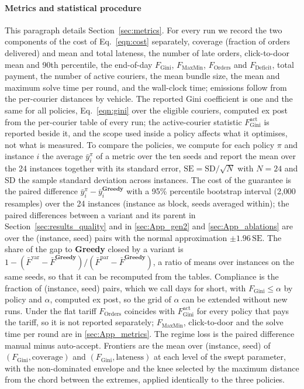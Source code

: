 \documentclass[a4paper,11pt,review,3p,authoryear]{elsarticle}
\newcommand{\FG}{F_{\text{Gini}}}
\newcommand{\FGa}{F_{\text{Gini}}^{\text{act}}}
\newcommand{\FD}{F_{\text{Deficit}}}
\newcommand{\FO}{F_{\text{Orders}}}
\newcommand{\FM}{F_{\text{MaxMin}}}
\begin{document}
\paragraph{Metrics and statistical procedure} This paragraph details Section~\ref{sec:metrics}. For every run we record the two components of the cost of Eq.~\eqref{eqn:cost} separately, coverage (fraction of orders delivered) and mean and total lateness, the number of late orders, click-to-door mean and 90th percentile, the end-of-day $\FG$, $\FM$, $\FO$ and $\FD$, total payment, the number of active couriers, the mean bundle size, the mean and maximum solve time per round, and the wall-clock time; emissions follow from the per-courier distances by vehicle. The reported Gini coefficient is one and the same for all policies, Eq.~\eqref{eqn:gini} over the eligible couriers, computed ex post from the per-courier table of every run; the active-courier statistic $\FGa$ is reported beside it, and the scope used inside a policy affects what it optimises, not what is measured. To compare the policies, we compute for each policy $\pi$ and instance $i$ the average $\bar y_i^{\pi}$ of a metric over the ten seeds and report the mean over the 24 instances together with its standard error, $\mathrm{SE} = \mathrm{SD}/\sqrt{N}$ with $N = 24$ and SD the sample standard deviation across instances. The cost of the guarantee is the paired difference $\bar y_i^{\pi} - \bar y_i^{\textbf{Greedy}}$ with a 95\% percentile bootstrap interval (2{,}000 resamples) over the 24 instances (instance as block, seeds averaged within); the paired differences between a variant and its parent in Section~\ref{sec:results_quality} and in \ref{sec:App_gen2} and \ref{sec:App_ablations} are over the (instance, seed) pairs with the normal approximation $\pm 1.96\,\mathrm{SE}$. The share of the gap to \textbf{Greedy} closed by a variant is $1 - (\bar F^{\text{var}} - \bar F^{\textbf{Greedy}})/(\bar F^{\text{par}} - \bar F^{\textbf{Greedy}})$, a ratio of means over instances on the same seeds, so that it can be recomputed from the tables. Compliance is the fraction of (instance, seed) pairs, which we call days for short, with $\FG \le \alpha$ by policy and $\alpha$, computed ex post, so the grid of $\alpha$ can be extended without new runs. Under the flat tariff $\FO$ coincides with $\FGa$ for every policy that pays the tariff, so it is not reported separately; $\FM$, click-to-door and the solve time per round are in \ref{sec:App_metrics}. The regime loss is the paired difference manual minus auto-accept. Frontiers are the mean over (instance, seed) of $(\FG, \text{coverage})$ and $(\FG, \text{lateness})$ at each level of the swept parameter, with the non-dominated envelope and the knee selected by the maximum distance from the chord between the extremes, applied identically to the three policies.
\end{document}
